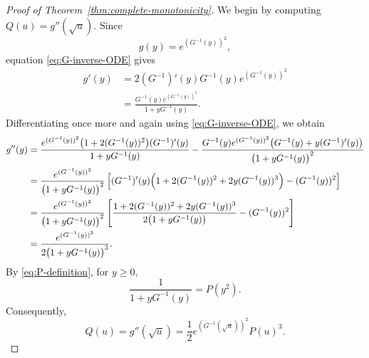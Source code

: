 \documentclass[10pt,a4paper]{amsart}
\begin{document}
\begin{proof}[Proof of Theorem~\ref{thm:complete-monotonicity}]
We begin by computing $Q(u)=g''(\sqrt{u})$.  Since
\[
 g(y)=e^{(G^{-1}(y))^2},
\]
equation \eqref{eq:G-inverse-ODE} gives
\[
\begin{aligned}
 g'(y)
 &=2(G^{-1})'(y)G^{-1}(y)e^{(G^{-1}(y))^2} \\
 &=\frac{G^{-1}(y)e^{(G^{-1}(y))^2}}
         {1+yG^{-1}(y)}.
\end{aligned}
\]
Differentiating once more and again using
\eqref{eq:G-inverse-ODE}, we obtain
\begin{align*}
 g''(y)
 &=
 \frac{
 e^{(G^{-1}(y))^2}
 \bigl(1+2(G^{-1}(y))^2\bigr)(G^{-1})'(y)}
 {1+yG^{-1}(y)}-
 \frac{
 G^{-1}(y)e^{(G^{-1}(y))^2}
 \bigl(G^{-1}(y)+y(G^{-1})'(y)\bigr)}
 {\bigl(1+yG^{-1}(y)\bigr)^2}
 \\
 &=
 \frac{e^{(G^{-1}(y))^2}}
      {\bigl(1+yG^{-1}(y)\bigr)^2}
 \left[
 (G^{-1})'(y)
 \Bigl(
  1+2(G^{-1}(y))^2+2y(G^{-1}(y))^3
 \Bigr)
 -(G^{-1}(y))^2
 \right]
 \\
 &=
 \frac{e^{(G^{-1}(y))^2}}
      {\bigl(1+yG^{-1}(y)\bigr)^2}
 \left[
 \frac{
  1+2(G^{-1}(y))^2+2y(G^{-1}(y))^3}
 {2\bigl(1+yG^{-1}(y)\bigr)}
 -(G^{-1}(y))^2
 \right]
 \\
 &=
 \frac{e^{(G^{-1}(y))^2}}
      {2\bigl(1+yG^{-1}(y)\bigr)^3}.
\end{align*}
By \eqref{eq:P-definition}, for $y\geq0$,
\[
 \frac1{1+yG^{-1}(y)}=P(y^2).
\]
Consequently,
\begin{equation}\label{eq:Q-P-formula}
 Q(u)=g''(\sqrt{u})
 =\frac12e^{(G^{-1}(\sqrt{u}))^2}P(u)^3.
\end{equation}


\end{proof}
\end{document}
